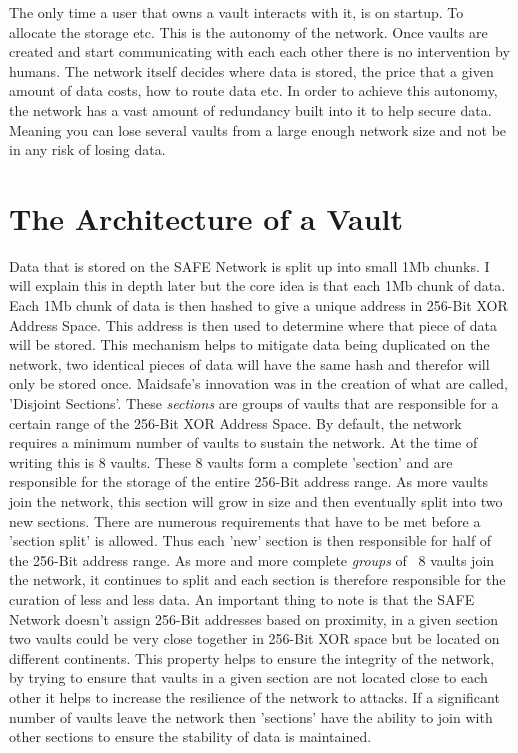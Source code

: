 The only time a user that owns a vault interacts with it, is on startup. To allocate the storage etc. This is the autonomy of the network. Once vaults are created and start communicating with each each other there is no intervention by humans. The network itself decides where data is stored, the price that a given amount of data costs, how to route data etc. In order to achieve this autonomy, the network has a vast amount of redundancy built into it to help secure data. Meaning you can lose several vaults from a large enough network size and not be in any risk of losing data.

\section{The Architecture of a Vault}

Data that is stored on the SAFE Network is split up into small 1Mb chunks. I will explain this in depth later but the core idea is that each 1Mb chunk of data. Each 1Mb chunk of data is then hashed to give a unique address in 256-Bit XOR Address Space. This address is then used to determine where that piece of data will be stored. This mechanism helps to mitigate data being duplicated on the network, two identical pieces of data will have the same hash and therefor will only be stored once. Maidsafe's innovation was in the creation of what are called, 'Disjoint Sections'. These \textit{sections} are groups of vaults that are responsible for a certain range of the 256-Bit XOR Address Space. By default, the network requires a minimum number of vaults to sustain the network. At the time of writing this is 8 vaults. These 8 vaults form a complete 'section' and are responsible for the storage of the entire 256-Bit address range. As more vaults join the network, this section will grow in size and then eventually split into two new sections. There are numerous requirements that have to be met before a 'section split' is allowed. Thus each 'new' section is then responsible for half of the 256-Bit address range. As more and more complete \textit{groups} of ~8 vaults join the network, it continues to split and each section is therefore responsible for the curation of less and less data. An important thing to note is that the SAFE Network doesn't assign 256-Bit addresses based on proximity, in a given section two vaults could be very close together in 256-Bit XOR space but be located on different continents. This property helps to ensure the integrity of the network, by trying to ensure that vaults in a given section are not located close to each other it helps to increase the resilience of the network to attacks. If a significant number of vaults leave the network then 'sections' have the ability to join with other sections to ensure the stability of data is maintained.

